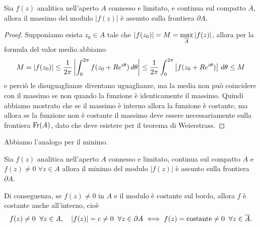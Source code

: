 \begin{theorem}
  Sia $ f(z) $ analitica nell'aperto $ A $ connesso e limitato, e continua sul compatto $ \overline{A} $, allora il massimo del modulo 
  $ |f(z)| $ è assunto sulla frontiera $ \partial A $.
\end{theorem}
\begin{proof}
  Supponiamo esista $ z_0 \in A $ tale che $ \left|{f(z_0)}\right| = M = \displaystyle\max_{\overline{A}} \left|{f(z)}\right| $, allora per la formula del valor medio abbiamo 
  \begin{align}
    M = \left|{f(z_0)}\right| \leq \frac1{2\pi} \left|{\int_0^{2\pi} f(z_0 + R e^{i\theta})\,d\theta}\right| 
    \leq \frac1{2\pi}\int_0^{2\pi} \left|{ f(z_0 + R e^{i\theta})}\right|\,d\theta \leq M 
  \end{align}
  e perciò le disuguaglianze diventano uguaglianze, ma la media non può coincidere con il massimo se non quando la funzione è identicamente il massimo. 
  Quindi abbiamo mostrato che se il massimo è interno allora la funzione è costante, ma allora se la funzione non è costante il massimo deve essere 
  necessariamente sulla frontiera $ \textnormal{Fr}(A) $, dato che deve esistere per il teorema di Weierstrass.
\end{proof}

Abbiamo l'analogo per il minimo.
\begin{theorem}
  Sia $ f(z) $ analitica nell'aperto $ A $ connesso e limitato, continua sul compatto $ \overline{A} $ e $ f(z) \neq 0 \; \forall z \in A $ 
  allora il minimo del modulo $ |f(z)| $ è assunto sulla frontiera $ \partial A $.
\end{theorem}
Di conseguenza, se $ f(z) \neq 0 $ in $ A $ e il modulo è costante sul bordo,
allora $ f $ è costante anche all'interno, cioè
\begin{align}
  f(z)\neq 0 \;\; \forall z \in A, \quad |f(z)| = c \neq 0 \;\;\forall z\in \partial A \iff f(z) = \textnormal{costante} \neq 0 \;\; \forall z \in \overline{A}.
\end{align}

